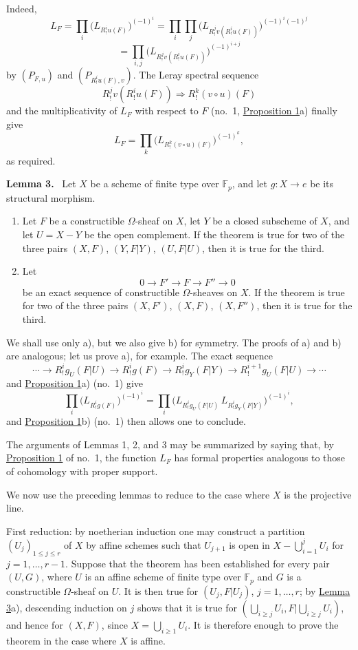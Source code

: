 \documentclass[11pt]{article}
\newenvironment{statement}[1]{\par\medskip\noindent\textbf{#1.}\ }{\par\medskip}
\begin{document}
Indeed,
\[
L_F=\prod_i\bigl(L_{R^i_!u(F)}\bigr)^{(-1)^i}
 =\prod_i\prod_j\bigl(L_{R^j_!v(R^i_!u(F))}\bigr)^{(-1)^i(-1)^j}
\]
\[
=\prod_{i,j}\bigl(L_{R^j_!v(R^i_!u(F))}\bigr)^{(-1)^{i+j}}
\]
by $(P_{F,u})$ and $(P_{R^i_!u(F),v})$. The Leray spectral sequence
\[
R^j_!v(R^i_!u(F))\Longrightarrow R^k_!(v\circ u)(F)
\]
and the multiplicativity of $L_F$ with respect to $F$ (no.~1, \hyperref[sga5:XV:proposition:1:3]{Proposition 1}a) finally give
\[
L_F=\prod_k\bigl(L_{R^k_!(v\circ u)(F)}\bigr)^{(-1)^k},
\]
as required.

\label{sga5:XV:lemma:3}\begin{statement}{Lemma 3}
Let $X$ be a scheme of finite type over $\mathbb F_p$, and let $g:X\to e$ be its structural morphism.
\begin{enumerate}[label=\alph*)]
\item Let $F$ be a constructible $\Omega$-sheaf on $X$, let $Y$ be a closed subscheme of $X$, and let $U=X-Y$ be the open complement. If the theorem is true for two of the three pairs $(X,F)$, $(Y,F|Y)$, $(U,F|U)$, then it is true for the third.
\item Let
\[
0\longrightarrow F'\longrightarrow F\longrightarrow F''\longrightarrow0
\]
be an exact sequence of constructible $\Omega$-sheaves on $X$. If the theorem is true for two of the three pairs $(X,F')$, $(X,F)$, $(X,F'')$, then it is true for the third.
\end{enumerate}
\end{statement}

We shall use only a), but we also give b) for symmetry. The proofs of a) and b) are analogous; let us prove a), for example. The exact sequence
\[
\cdots\longrightarrow R^i_!g_U(F|U)\longrightarrow R^i_!g(F)
\longrightarrow R^i_!g_Y(F|Y)\longrightarrow R^{i+1}_!g_U(F|U)\longrightarrow\cdots
\]
and \hyperref[sga5:XV:proposition:1:3]{Proposition 1}a) (no.~1) give
\[
\prod_i\bigl(L_{R^i_!g(F)}\bigr)^{(-1)^i}
=\prod_i\bigl(L_{R^i_!g_U(F|U)}\,L_{R^i_!g_Y(F|Y)}\bigr)^{(-1)^i},
\]
and \hyperref[sga5:XV:proposition:1:3]{Proposition 1}b) (no.~1) then allows one to conclude.

The arguments of Lemmas 1, 2, and 3 may be summarized by saying that, by \hyperref[sga5:XV:proposition:1:3]{Proposition 1} of no.~1, the function $L_F$ has formal properties analogous to those of cohomology with proper support.

We now use the preceding lemmas to reduce to the case where $X$ is the projective line.

First reduction: by noetherian induction one may construct a partition $(U_j)_{1\le j\le r}$ of $X$ by affine schemes such that $U_{j+1}$ is open in $X-\bigcup_{i=1}^jU_i$ for $j=1,\ldots,r-1$. Suppose that the theorem has been established for every pair $(U,G)$, where $U$ is an affine scheme of finite type over $\mathbb F_p$ and $G$ is a constructible $\Omega$-sheaf on $U$. It is then true for $(U_j,F|U_j)$, $j=1,\ldots,r$; by \hyperref[sga5:XV:lemma:3]{Lemma 3}a), descending induction on $j$ shows that it is true for $(\bigcup_{i\ge j}U_i,F|\bigcup_{i\ge j}U_i)$, and hence for $(X,F)$, since $X=\bigcup_{i\ge1}U_i$. It is therefore enough to prove the theorem in the case where $X$ is affine.
\end{document}
